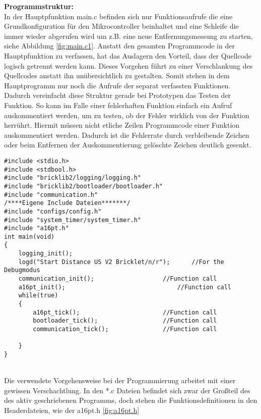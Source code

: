 \textbf{Programmstruktur:}\\
In der Hauptpfunktion main.c befinden sich nur Funktionsaufrufe die eine Grundkonfiguration  für den Mikrocontroller beinhaltet und eine Schleife die immer wieder abgerufen wird um z.B. eine neue Entfernungsmessung zu starten, siehe Abbildung \ref{fig:main.c1}. Anstatt den gesamten Programmcode in der Hauptpfunktion zu verfassen, hat das Auslagern den Vorteil, dass der Quellcode logisch getrennt werden kann. Dieses Vorgehen führt zu einer Verschlankung des Quellcodes anstatt ihn unübersichtlich zu gestalten. Somit stehen in dem Hauptprogramm nur noch die Aufrufe der separat verfassten Funktionen. Dadurch vereinfacht diese Struktur gerade bei Prototypen das Testen der Funktion. So kann im Falle einer fehlerhaften Funktion einfach ein Aufruf auskommentiert werden, um zu testen, ob der Fehler wirklich von der Funktion herrührt. Hiermit müssen nicht etliche Zeilen Programmcode einer Funktion auskommentiert werden. Dadurch ist die Fehlerrate durch verbleibende Zeichen oder beim Entfernen der Auskommentierung gelöschte Zeichen deutlich gesenkt.\\
\begin{minipage}{1\textwidth}
\begin{lstlisting}
#include <stdio.h>
#include <stdbool.h>
#include "bricklib2/logging/logging.h"
#include "bricklib2/bootloader/bootloader.h"
#include "communication.h"
/****Eigene Include Dateien*******/
#include "configs/config.h"
#include "system_timer/system_timer.h"
#include "a16pt.h"
int main(void)
{ 
	logging_init(); 
	logd("Start Distance US V2 Bricklet/n/r");  	//For the Debugmodus
	communication_init(); 					//Function call
	a16pt_init(); 								//Function call	
	while(true)
	{
		a16pt_tick(); 						//Function call
		bootloader_tick(); 					//Function call
		communication_tick(); 				//Function call
		
	}
}
\end{lstlisting}
\label{fig:main.c1}
\end{minipage}\\
Die verwendete Vorgehensweise bei der Programmierung arbeitet mit einer gewissen Verschachtlung. In den *.c Dateien befindet sich zwar der Großteil des des aktiv geschriebenen Programms, doch stehen die Funktionsdefinitionen in den Headerdateien, wie der a16pt.h \ref{fig:a16pt.h}\\
